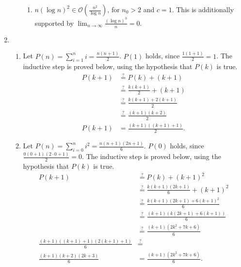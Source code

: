\documentclass[12pt]{article}
\newcommand{\posseq}{\stackrel{?}{=}}
\begin{document}
\begin{enumerate}
\begin{enumerate}
\begin{enumerate}
      \item $n (\log n)^{2} \in \mathcal{O}(\frac{n^{2}}{\log n})$, for $n_{0} > 2$ and $c = 1$. This is additionally supported by $\lim_{n\to\infty} \frac{(\log n)^{3}}{n} = 0$.
    \end{enumerate}
  \end{enumerate}
  
  \item
  \begin{enumerate}
    \item Let $P(n) = \sum_{i = 1}^{n} i = \frac{n (n + 1)}{2}$. $P(1)$ holds, since $\frac{1 (1 + 1)}{2} = 1$. The inductive step is proved below, using the hypothesis that $P(k)$ is true.
    \begin{align*}
      P(k + 1) & \posseq P(k) + (k + 1)                  \\
               & \posseq \tfrac{k (k + 1)}{2} + (k + 1)  \\
               & \posseq \tfrac{k (k + 1) + 2(k + 1)}{2} \\
               & \posseq \tfrac{(k + 1)(k + 2)}{2}       \\
      P(k + 1) & = \tfrac{(k + 1)((k + 1) + 1)}{2}.
    \end{align*}
    
    \item Let $P(n) = \sum_{i = 0}^{n} i^{2} = \frac{n (n + 1) (2n + 1)}{6}$. $P(0)$ holds, since $\frac{0 (0 + 1) (2 \cdot 0 + 1)}{2} = 0$. The inductive step is proved below, using the hypothesis that $P(k)$ is true.
    \begin{align*}
      P(k + 1)                                      & \posseq P(k) + (k + 1)^{2}                           \\
                                                    & \posseq \tfrac{k (k + 1) (2k + 1)}{6} + (k + 1)^{2}  \\
                                                    & \posseq \tfrac{k (k + 1) (2k + 1) + 6(k + 1)^{2}}{6} \\
                                                    & \posseq \tfrac{(k + 1)(k(2k + 1) + 6(k + 1))}{6}     \\
                                                    & \posseq \tfrac{(k + 1)(2k^2 + 7k + 6)}{6}            \\
      \tfrac{(k + 1)((k + 1) + 1)(2(k + 1) + 1)}{6} & \posseq                                              \\
      \tfrac{(k + 1)(k + 2)(2k + 3)}{6}             & = \tfrac{(k + 1)(2k^2 + 7k + 6)}{6}.
    \end{align*}
    

\end{enumerate}
\end{enumerate}
\end{document}
